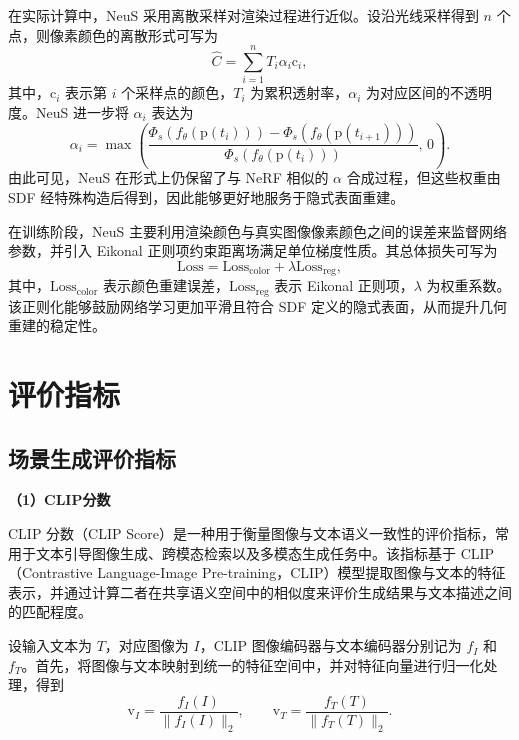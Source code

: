 在实际计算中，NeuS 采用离散采样对渲染过程进行近似。设沿光线采样得到 $n$ 个点，则像素颜色的离散形式可写为
\begin{equation}
\hat{C}=\sum_{i=1}^{n}T_i\alpha_i\text{c}_i,
\label{eq:neus_discrete_render}
\end{equation}
其中，$\text{c}_i$ 表示第 $i$ 个采样点的颜色，$T_i$ 为累积透射率，$\alpha_i$ 为对应区间的不透明度。NeuS 进一步将 $\alpha_i$ 表达为
\begin{equation}
\alpha_i=
\max\left(
\frac{\Phi_s(f_{\theta}(\text{p}(t_i)))-\Phi_s(f_{\theta}(\text{p}(t_{i+1})))}
{\Phi_s(f_{\theta}(\text{p}(t_i)))},\,0
\right).
\label{eq:neus_alpha}
\end{equation}
由此可见，NeuS 在形式上仍保留了与 NeRF 相似的 $\alpha$ 合成过程，但这些权重由 SDF 经特殊构造后得到，因此能够更好地服务于隐式表面重建。

在训练阶段，NeuS 主要利用渲染颜色与真实图像像素颜色之间的误差来监督网络参数，并引入 Eikonal 正则项约束距离场满足单位梯度性质。其总体损失可写为
\begin{equation}
\text{Loss}
=
\text{Loss}_{\mathrm{color}}
+
\lambda \text{Loss}_{\mathrm{reg}},
\label{eq:neus_total_loss}
\end{equation}
其中，$\text{Loss}_{\mathrm{color}}$ 表示颜色重建误差，$\text{Loss}_{\mathrm{reg}}$ 表示 Eikonal 正则项，$\lambda$ 为权重系数。该正则化能够鼓励网络学习更加平滑且符合 SDF 定义的隐式表面，从而提升几何重建的稳定性。



\section{评价指标}
\label{sec:evaluation_metrics}


\subsection{场景生成评价指标}
\noindent\textbf{（1）CLIP分数}

CLIP 分数\cite{hessel2021clipscore}（CLIP Score）是一种用于衡量图像与文本语义一致性的评价指标，常用于文本引导图像生成、跨模态检索以及多模态生成任务中。该指标基于 CLIP（Contrastive Language-Image Pre-training\cite{radford2021learning}，CLIP）模型提取图像与文本的特征表示，并通过计算二者在共享语义空间中的相似度来评价生成结果与文本描述之间的匹配程度。

设输入文本为 $T$，对应图像为 $I$，CLIP 图像编码器与文本编码器分别记为 $f_I$ 和 $f_T$。首先，将图像与文本映射到统一的特征空间中，并对特征向量进行归一化处理，得到
\begin{equation}
\text{v}_I = \frac{f_I(I)}{\|f_I(I)\|_2}, \qquad
\text{v}_T = \frac{f_T(T)}{\|f_T(T)\|_2} .
\label{eq:clip_feature}
\end{equation}

